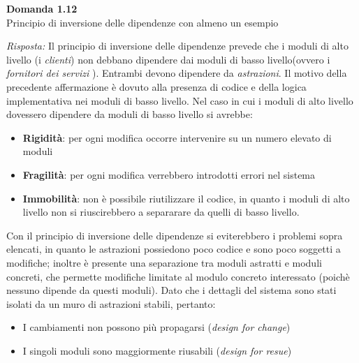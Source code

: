 \documentclass{article}
\newenvironment{problem}[2][Domanda]
    { \begin{mdframed}[backgroundcolor=gray!20] \textbf{#1 #2} \\}
    {  \end{mdframed}}
\newenvironment{solution}
    {\textit{Risposta:}}
    {}
\begin{document}
\begin{problem}{1.12}
Principio di inversione delle dipendenze con almeno un esempio
\end{problem}
\begin{solution}
Il principio di inversione delle dipendenze prevede che i moduli di alto livello (i \textit{clienti}) non debbano dipendere dai moduli di basso livello(ovvero i \textit{fornitori dei servizi} ). Entrambi devono dipendere da \textit{astrazioni}.
\newline
Il motivo della precedente affermazione è dovuto alla presenza di codice e della logica implementativa nei moduli di basso livello. Nel caso in cui i moduli di alto livello dovessero dipendere da moduli di basso livello si avrebbe:
\begin{itemize}
	\item \textbf{Rigidità}: per ogni modifica occorre intervenire su un numero elevato di moduli
	\item \textbf{Fragilità}: per ogni modifica verrebbero introdotti errori nel sistema
	\item \textbf{Immobilità}: non è possibile riutilizzare il codice, in quanto i moduli di alto livello non si riuscirebbero a separarare da quelli di basso livello.
\end{itemize}
Con il principio di inversione delle dipendenze si eviterebbero i problemi sopra elencati, in quanto le astrazioni possiedono poco codice e sono poco soggetti a modifiche; inoltre è presente una separazione tra moduli astratti e moduli concreti, che permette modifiche limitate al modulo concreto interessato (poichè nessuno dipende da questi moduli).
Dato che i dettagli del sistema sono stati isolati da un muro di astrazioni stabili, pertanto:
\begin{itemize}
	\item I cambiamenti non possono più propagarsi (\textit{design for change})
	\item I singoli moduli sono maggiormente riusabili (\textit{design for resue})
\end{itemize}
\end{solution}
\end{document}
